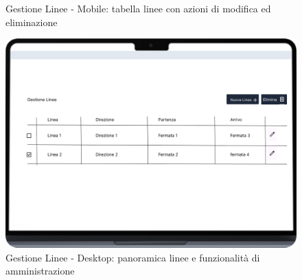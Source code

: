 \begin{figure}[H]
\begin{minipage}[b]{0.25\textwidth}
    \caption{Gestione Linee - Mobile: tabella linee con azioni di modifica ed eliminazione}
    \label{fig:gestione-linee-mobile}
  \end{minipage}
  \hfill
  \begin{minipage}[b]{0.68\textwidth}
    \centering
    \includegraphics[width=\textwidth]{images/mockup/Gestione Linee Desktop.png}
    \caption{Gestione Linee - Desktop: panoramica linee e funzionalità di amministrazione}
    \label{fig:gestione-linee-desktop}
  \end{minipage}
\end{figure}
